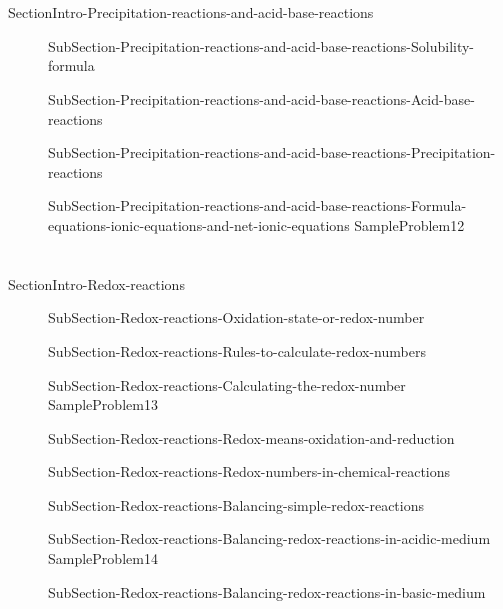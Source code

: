 \documentclass[main.tex]{subfiles} %
\begin{document}
\section{\color{blue!30!black}{Precipitation reactions and acid-base reactions}}
{SectionIntro-Precipitation-reactions-and-acid-base-reactions}
\sloppy \begin{description}
\item[] {SubSection-Precipitation-reactions-and-acid-base-reactions-Solubility-formula}
\item[]{SubSection-Precipitation-reactions-and-acid-base-reactions-Acid-base-reactions}
\item[] {SubSection-Precipitation-reactions-and-acid-base-reactions-Precipitation-reactions}
\item[]{SubSection-Precipitation-reactions-and-acid-base-reactions-Formula-equations-ionic-equations-and-net-ionic-equations}
{SampleProblem12}
\end{description}

\section{\color{blue!30!black}{Redox reactions}}
{SectionIntro-Redox-reactions}
\sloppy \begin{description}
\item[]{SubSection-Redox-reactions-Oxidation-state-or-redox-number}
 \item[]{SubSection-Redox-reactions-Rules-to-calculate-redox-numbers}
 \item[]{SubSection-Redox-reactions-Calculating-the-redox-number}
 {SampleProblem13}
\item[]{SubSection-Redox-reactions-Redox-means-oxidation-and-reduction}
 \item[]{SubSection-Redox-reactions-Redox-numbers-in-chemical-reactions}
 \item[] {SubSection-Redox-reactions-Balancing-simple-redox-reactions}
\item[] {SubSection-Redox-reactions-Balancing-redox-reactions-in-acidic-medium}
{SampleProblem14}
\item[] {SubSection-Redox-reactions-Balancing-redox-reactions-in-basic-medium}
\end{description}
\end{document}
